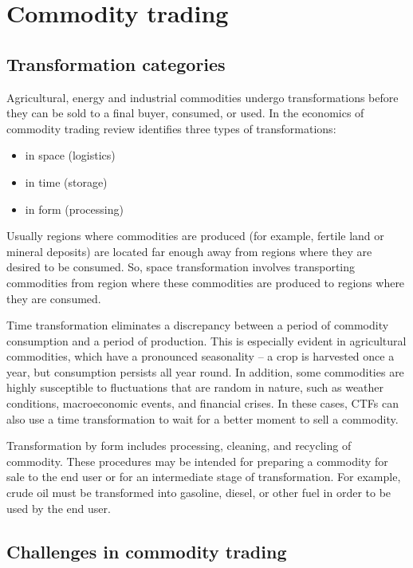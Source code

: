 \documentclass{article}
\begin{document}
\section{Commodity trading}
\label{section:case}
\subsection{Transformation categories}

Agricultural, energy and industrial commodities undergo transformations before they can be sold to a final buyer, consumed, or used. In the economics of commodity trading review \cite{Pirrong} identifies three types of transformations:
\begin{itemize}
    \item in space (logistics)
    \item in time (storage)
    \item in form (processing)
\end{itemize}

Usually regions where commodities are produced (for example, fertile land or mineral deposits) are located far enough away from regions where they are desired to be consumed. So, space transformation involves transporting commodities from region where these commodities are produced to regions where they are consumed.

Time transformation eliminates a discrepancy between a period of commodity consumption and a period of production. This is especially evident in agricultural commodities, which have a pronounced seasonality -- a crop is harvested once a year, but consumption persists all year round. In addition, some commodities are highly susceptible to fluctuations that are random in nature, such as weather conditions, macroeconomic events, and financial crises. In these cases, CTFs can also use a time transformation to wait for a better moment to sell a commodity.

Transformation by form includes processing, cleaning, and recycling of commodity. These procedures may be intended for preparing a commodity for sale to the end user or for an intermediate stage of transformation. For example, crude oil must be transformed into gasoline, diesel, or other fuel in order to be used by the end user.

\subsection{Challenges in commodity trading}
\end{document}
